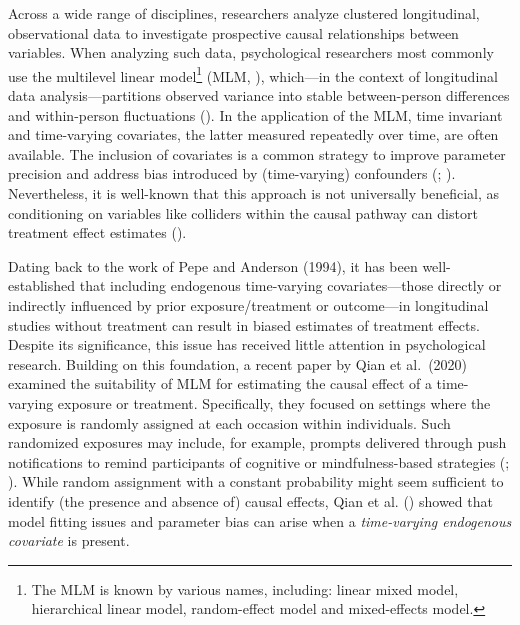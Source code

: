 \documentclass[
  11pt,
  a4paper,
]{article}
\begin{document}
Across a wide range of disciplines, researchers analyze clustered
longitudinal, observational data to investigate prospective causal
relationships between variables. When analyzing such data, psychological
researchers most commonly use the multilevel linear model\footnote{The
  MLM is known by various names, including: linear mixed model,
  hierarchical linear model, random-effect model and mixed-effects
  model.} (MLM, ),
which---in the context of longitudinal data analysis---partitions
observed variance into stable between-person differences and
within-person fluctuations (). In the application of the MLM, time invariant and
time-varying covariates, the latter measured repeatedly over time, are
often available. The inclusion of covariates is a common strategy to
improve parameter precision and address bias introduced by
(time-varying) confounders (; ). Nevertheless, it is
well-known that this approach is not universally beneficial, as
conditioning on variables like colliders within the causal pathway can
distort treatment effect estimates ().

Dating back to the work of Pepe and Anderson (1994), it has been
well-established that including endogenous time-varying
covariates---those directly or indirectly influenced by prior
exposure/treatment or outcome---in longitudinal studies without
treatment can result in biased estimates of treatment effects. Despite
its significance, this issue has received little attention in
psychological research. Building on this foundation, a recent paper by
Qian et al.~(2020) examined the suitability of MLM for estimating the
causal effect of a time-varying exposure or treatment. Specifically,
they focused on settings where the exposure is randomly assigned at each
occasion within individuals. Such randomized exposures may include, for
example, prompts delivered through push notifications to remind
participants of cognitive or mindfulness-based strategies
(;
). While random assignment
with a constant probability might seem sufficient to identify (the
presence and absence of) causal effects, Qian et al.
() showed that model fitting issues and
parameter bias can arise when a \emph{time-varying endogenous covariate}
is present.
\end{document}
